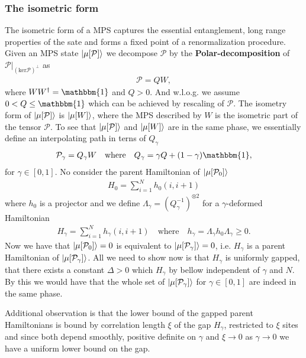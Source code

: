 \subsubsection{The isometric form}
The isometric form of a MPS captures the essential entanglement, long
range properties of the sate and forms a fixed point of a renormalization
procedure. Given an MPS state $\ket{\mu[\mathcal{P}]}$ we decompose
$\mathcal{P}$ by the \textbf{Polar-decomposition} of
$\mathcal{P}|_{(\text{ker}\mathcal{P})^\perp}$ as
\begin{align}
    \mathcal{P} = QW,
\end{align}
where $WW^\dagger= \mathbbm{1}$ and $Q > 0$. And w.l.o.g. we assume $0<Q\le
\mathbbm{1}$ which can be achieved by rescaling of $\mathcal{P}$. The
isometry form of $\ket{\mu[\mathcal{P}]}$ is $\ket{\mu[W]}$, where the MPS
described by $W$ is the isometric part of the tensor $\mathcal{P}$. To see
that $\ket{\mu[\mathcal{P}]}$ and $\ket{\mu[W]}$ are in the same phase, we
essentially define an interpolating path in terns of $Q_\gamma$
\begin{align}
    \mathcal{P}_\gamma = Q_\gamma W \quad \text{where} \quad
    Q_\gamma = \gamma Q + (1-\gamma)\mathbbm{1},
\end{align}
for $\gamma \in [0, 1]$. No consider the parent Hamiltonian of
$\ket{\mu[\mathcal{P}_0]}$
\begin{align}
    H_0 = \sum_{i=1}^{N}h_0 (i, i+1)
\end{align}
where $h_0$ is a projector and we define $\Lambda_\gamma =
(Q^{-1}_\gamma)^{\otimes  2}$ for a $\gamma$-deformed Hamiltonian
\begin{align}
    H_\gamma = \sum_{i=1}^{N} h_\gamma(i, i+1) \quad \text{where} \quad
    h_\gamma =
    \Lambda_\gamma h_0 \Lambda_\gamma \ge 0.
\end{align}
Now we have that $\ket{\mu[\mathcal{P}_0]} = 0$ is equivalent to
$\ket{\mu[\mathcal{P}_\gamma]} = 0$, i.e. $H_\gamma$ is a parent Hamiltonian
of $\ket{\mu[\mathcal{P}_\gamma]}$. All we need to show now is that
$H_\gamma$ is uniformly gapped, that there exists a constant $\Delta >0$
which $H_\gamma$ by bellow independent of $\gamma$ and $N$. By this we would
have that the whole set of $\ket{\mu[\mathcal{P}_\gamma]}$ for $\gamma \in
[0, 1]$ are indeed in the same phase.

Additional observation is that the lower bound of the gapped parent
Hamiltonians is bound by correlation length $\xi$ of the gap $H_\gamma$,
restricted to $\xi$ sites and since both depend smoothly, positive definite
on $\gamma$ and $\xi \rightarrow 0$ as $\gamma \rightarrow 0$ we have a
uniform lower bound on the gap.


